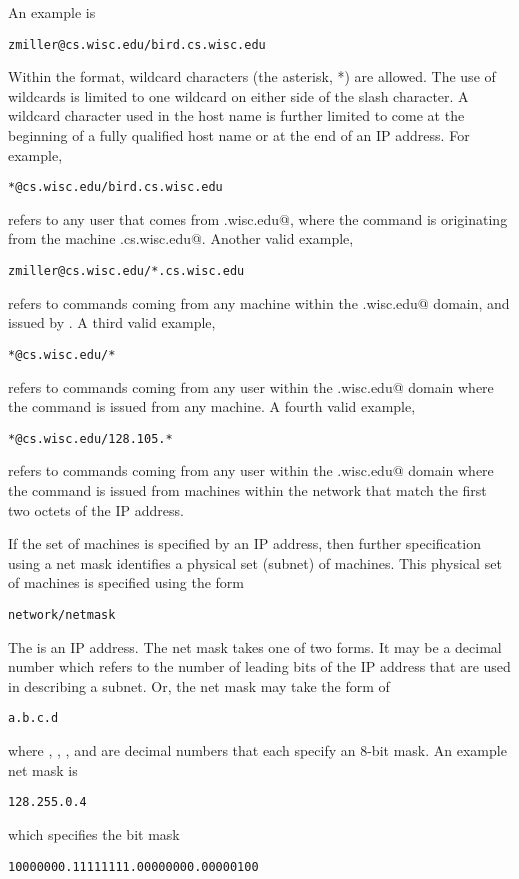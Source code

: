 An example is
\begin{verbatim}
zmiller@cs.wisc.edu/bird.cs.wisc.edu
\end{verbatim}

Within the format, wildcard characters (the asterisk, *) are allowed.
The use of wildcards is limited to one wildcard on either side
of the slash character.
A wildcard character used in the host name is further limited
to come at the beginning of a fully qualified host name
or at the end of an IP address.
For example,
\begin{verbatim}
*@cs.wisc.edu/bird.cs.wisc.edu
\end{verbatim}
refers to any user that comes from \verb@cs.wisc.edu@,
where the command is originating from the machine
\verb@bird.cs.wisc.edu@.
Another valid example,
\begin{verbatim}
zmiller@cs.wisc.edu/*.cs.wisc.edu
\end{verbatim}
refers to commands coming from any machine within the 
\verb@cs.wisc.edu@ domain, and issued by \verb@zmiller@.
A third valid example,
\begin{verbatim}
*@cs.wisc.edu/*
\end{verbatim}
refers to commands coming from any user within the 
\verb@cs.wisc.edu@ domain
where the command is issued from any machine.
A fourth valid example,
\begin{verbatim}
*@cs.wisc.edu/128.105.*
\end{verbatim}
refers to commands coming from any user within the 
\verb@cs.wisc.edu@ domain
where the command is issued from machines within the network that match
the first two octets of the IP address.

If the set of machines is specified by an IP address,
then further specification using a net mask
identifies a physical set (subnet) of machines.
This physical set of machines is specified using the form
\begin{verbatim}
network/netmask
\end{verbatim}
The \verb@network@ is an IP address.
The net mask takes one of two forms.
It may be a decimal number which refers to the number of leading
bits of the IP address that are used in describing a subnet.
Or, the net mask may take the form of
\begin{verbatim}
a.b.c.d
\end{verbatim}
where \verb@a@,
\verb@b@,
\verb@c@, and
\verb@d@
are decimal numbers that each specify an 8-bit mask.
An example net mask is
\begin{verbatim}
128.255.0.4
\end{verbatim}
which specifies the bit mask
\begin{verbatim}
10000000.11111111.00000000.00000100
\end{verbatim}

